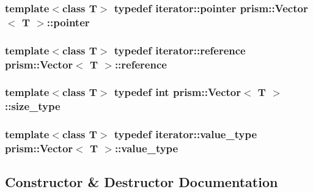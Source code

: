\subsubsection[{\texorpdfstring{pointer}{pointer}}]{\setlength{\rightskip}{0pt plus 5cm}template$<$class T$>$ typedef iterator\+::pointer {\bf prism\+::\+Vector}$<$ T $>$\+::{\bf pointer}}\hypertarget{classprism_1_1_vector_a9823d64f361cdff3fcc5043e8b4bd882}{}\label{classprism_1_1_vector_a9823d64f361cdff3fcc5043e8b4bd882}
\subsubsection[{\texorpdfstring{reference}{reference}}]{\setlength{\rightskip}{0pt plus 5cm}template$<$class T$>$ typedef iterator\+::reference {\bf prism\+::\+Vector}$<$ T $>$\+::{\bf reference}}\hypertarget{classprism_1_1_vector_a8ccf98342707efbed82918a44be97438}{}\label{classprism_1_1_vector_a8ccf98342707efbed82918a44be97438}
\subsubsection[{\texorpdfstring{size\+\_\+type}{size_type}}]{\setlength{\rightskip}{0pt plus 5cm}template$<$class T$>$ typedef int {\bf prism\+::\+Vector}$<$ T $>$\+::{\bf size\+\_\+type}}\hypertarget{classprism_1_1_vector_a14c909f500f13b8b7a276bb97ae746e8}{}\label{classprism_1_1_vector_a14c909f500f13b8b7a276bb97ae746e8}
\subsubsection[{\texorpdfstring{value\+\_\+type}{value_type}}]{\setlength{\rightskip}{0pt plus 5cm}template$<$class T$>$ typedef iterator\+::value\+\_\+type {\bf prism\+::\+Vector}$<$ T $>$\+::{\bf value\+\_\+type}}\hypertarget{classprism_1_1_vector_a12f8585af6daa44e7732880b3f725ee3}{}\label{classprism_1_1_vector_a12f8585af6daa44e7732880b3f725ee3}


\subsection{Constructor \& Destructor Documentation}

